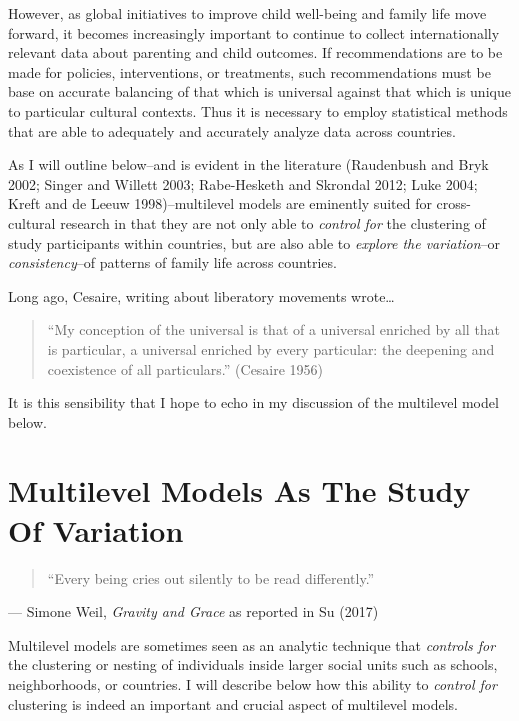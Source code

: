 \documentclass[
  letterpaper,
  DIV=11,
  numbers=noendperiod]{scrreprt}
\begin{document}
However, as global initiatives to improve child well-being and family
life move forward, it becomes increasingly important to continue to
collect internationally relevant data about parenting and child
outcomes. If recommendations are to be made for policies, interventions,
or treatments, such recommendations must be base on accurate balancing
of that which is universal against that which is unique to particular
cultural contexts. Thus it is necessary to employ statistical methods
that are able to adequately and accurately analyze data across
countries.

As I will outline below--and is evident in the literature (Raudenbush
and Bryk 2002; Singer and Willett 2003; Rabe-Hesketh and Skrondal 2012;
Luke 2004; Kreft and de Leeuw 1998)--multilevel models are eminently
suited for cross-cultural research in that they are not only able to
\emph{control for} the clustering of study participants within
countries, but are also able to \emph{explore the variation}--or
\emph{consistency}--of patterns of family life across countries.

Long ago, Cesaire, writing about liberatory movements wrote\ldots{}

\begin{quote}
``My conception of the universal is that of a universal enriched by all
that is particular, a universal enriched by every particular: the
deepening and coexistence of all particulars.'' (Cesaire 1956)
\end{quote}

It is this sensibility that I hope to echo in my discussion of the
multilevel model below.

\hypertarget{sec-studyvariation}{%
\section{Multilevel Models As The Study Of
Variation}\label{sec-studyvariation}}

\begin{quote}
``Every being cries out silently to be read differently.''
\end{quote}

--- Simone Weil, \emph{Gravity and Grace} as reported in Su (2017)

Multilevel models are sometimes seen as an analytic technique that
\emph{controls for} the clustering or nesting of individuals inside
larger social units such as schools, neighborhoods, or countries. I will
describe below how this ability to \emph{control for} clustering is
indeed an important and crucial aspect of multilevel models.
\end{document}
